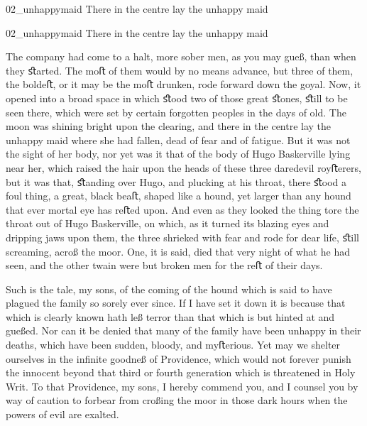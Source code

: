 \begin{letter}
	\begin{bwbigpic}
			[1.0]  
		{02_unhappymaid}
		{There in the centre lay the unhappy maid}
	\end{bwbigpic}
\end{letter}
\begin{a4}
	\begin{bwbigpic}
			[1.0]  
		{02_unhappymaid}
		{There in the centre lay the unhappy maid}
	\end{bwbigpic}
\end{a4}

The company had come to a halt, more sober men, as you may gueß, than when they ﬆarted. The moﬅ of them would by no means advance, but three of them, the boldeﬅ, or it may be the moﬅ drunken, rode forward down the goyal. Now, it opened into a broad space in which ﬆood two of those great ﬆones, ﬆill to be seen there, which were set by certain forgotten peoples in the days of old. The moon was shining bright upon the clearing, and there in the centre lay the unhappy maid where she had fallen, dead of fear and of fatigue. But it was not the sight of her body, nor yet was it that of the body of Hugo Baskerville lying near her, which raised the hair upon the heads of these three daredevil royﬅerers, but it was that, ﬆanding over Hugo, and plucking at his throat, there ﬆood a foul thing, a great, black beaﬅ, shaped like a hound, yet larger than any hound that ever mortal eye has reﬅed upon. And even as they looked the thing tore the throat out of Hugo Baskerville, on which, as it turned its blazing eyes and dripping jaws upon them, the three shrieked with fear and rode for dear life, ﬆill screaming, acroß the moor. One, it is said, died that very night of what he had seen, and the other twain were but broken men for the reﬅ of their days.

Such is the tale, my sons, of the coming of the hound which is said to have plagued the family so sorely ever since. If I have set it down it is because that which is clearly known hath leß terror than that which is but hinted at and gueßed. Nor can it be denied that many of the family have been unhappy in their deaths, which have been sudden, bloody, and myﬅerious. Yet may we shelter ourselves in the inﬁnite goodneß of Providence, which would not forever punish the innocent beyond that third or fourth generation which is threatened in Holy Writ. To that Providence, my sons, I hereby commend you, and I counsel you by way of caution to forbear from croßing the moor in those dark hours when the powers of evil are exalted.

